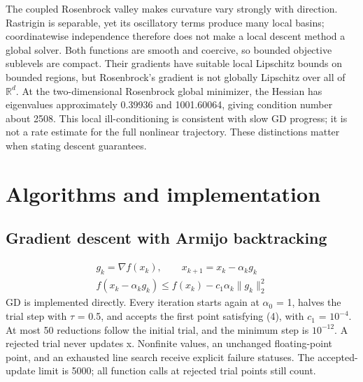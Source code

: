 \documentclass[10pt]{article}
\begin{document}
The coupled Rosenbrock valley makes curvature vary strongly with direction. Rastrigin is separable, yet its oscillatory terms produce many local basins; coordinatewise independence therefore does not make a local descent method a global solver. Both functions are smooth and coercive, so bounded objective sublevels are compact. Their gradients have suitable local Lipschitz bounds on bounded regions, but Rosenbrock's gradient is not globally Lipschitz over all of \(\mathbb{R}^d\). At the two-dimensional Rosenbrock global minimizer, the Hessian has eigenvalues approximately 0.39936 and 1001.60064, giving condition number about 2508. This local ill-conditioning is consistent with slow GD progress; it is not a rate estimate for the full nonlinear trajectory. These distinctions matter when stating descent guarantees.

\setcounter{section}{3}
\section{Algorithms and implementation}
\setcounter{section}{4}
\setcounter{subsection}{0}
\subsection{Gradient descent with Armijo backtracking}
\setcounter{equation}{3}
\begin{equation}
\begin{aligned}
g_k=\nabla f(x_k),\qquad x_{k+1}=x_k-\alpha_k g_k \\
f(x_k-\alpha_k g_k)\leq f(x_k)-c_1\alpha_k\|g_k\|_2^2
\end{aligned}
\label{eq:gd_armijo}
\end{equation}
GD is implemented directly. Every iteration starts again at \(\alpha_0\) = 1, halves the trial step with \(\tau\) = 0.5, and accepts the first point satisfying (4), with \(c_1\) = \(10^{-4}\). At most 50 reductions follow the initial trial, and the minimum step is \(10^{-12}\). A rejected trial never updates x. Nonfinite values, an unchanged floating-point point, and an exhausted line search receive explicit failure statuses. The accepted-update limit is 5000; all function calls at rejected trial points still count.


\newpage
\setcounter{section}{4}
\setcounter{subsection}{1}
\end{document}
